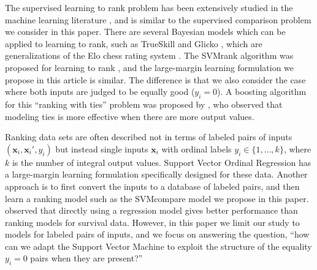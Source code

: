 \documentclass[twoside,11pt]{article}
\newcommand{\changed}[1]{
  #1
}
\begin{document}
The supervised learning to rank problem has been extensively studied
in the machine learning literature \citep{object-ranking-methods,
  learning-to-rank}, and is similar to the supervised comparison
problem we consider in this paper. There are several Bayesian models
which can be applied to learning to rank, such as TrueSkill
\citep{trueskill} and Glicko \citep{Glicko}, which are generalizations
of the Elo chess rating system \citep{elo_score}. The SVMrank algorithm was
proposed for learning to rank \citep{ranksvm}, and the large-margin
learning formulation we propose in this article is similar. The
difference is that we also consider the case where both inputs are
judged to be equally good ($y_i=0$). A boosting algorithm for this
``ranking with ties'' problem was proposed by \citet{rank-with-ties},
who observed that modeling ties is more effective when there are more
output values.

\changed{Ranking data sets are often described not in terms of labeled
  pairs of inputs $(\mathbf x_i, \mathbf x_i', y_i)$ but instead
  single inputs $\mathbf x_i$ with ordinal labels
  $y_i\in\{1,\dots,k\}$, where $k$ is the number of integral output
  values. Support Vector Ordinal Regression \citep{ordinal} has a
  large-margin learning formulation specifically designed for these
  data. Another approach is to first convert the inputs to a database
  of labeled pairs, and then learn a ranking model such as the
  SVMcompare model we propose in this paper. \citet{sv-survival}
  observed that directly using a regression model gives better
  performance than ranking models for survival data. However, in this
  paper we limit our study to models for labeled pairs of inputs, and
  we focus on answering the question, ``how can we adapt the Support
  Vector Machine to exploit the structure of the equality $y_i=0$
  pairs when they are present?''}

\end{document}
